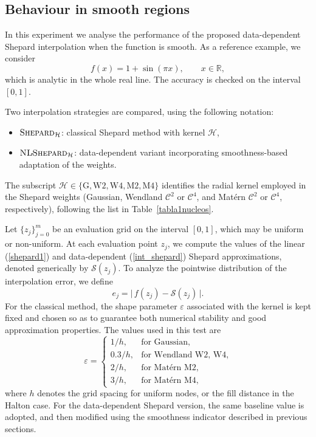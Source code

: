 \documentclass[preprint]{elsarticle}       %
\begin{document}
\subsection{Behaviour in smooth regions}

In this experiment we analyse the performance of the proposed data-dependent Shepard interpolation when the function is smooth. As a reference example, we consider
\begin{equation}\label{funcion_f}
f(x)=1+\sin(\pi x), \qquad x\in\mathbb{R},
\end{equation}
which is analytic in the whole real line. The accuracy is checked on the interval $[0,1]$.

Two interpolation strategies are compared, using the following notation:
\begin{itemize}
    \item $\textsc{Shepard}_{\mathcal H}$: classical Shepard method with kernel $\mathcal H$,
    \item $\textsc{NL\!-\!Shepard}_{\mathcal H}$: data-dependent variant incorporating smoothness-based adaptation of the weights.
\end{itemize}

The subscript $\mathcal H\in\{\text{G},\text{W2},\text{W4},\text{M2},\text{M4}\}$ identifies the radial kernel employed in the Shepard weights (Gaussian, Wendland $\mathcal{C}^2$ or $\mathcal{C}^4$, and Mat\'ern $\mathcal{C}^2$ or $\mathcal{C}^4$, respectively), following the list in Table~\ref{tabla1nucleos}.

Let \(\{z_j\}_{j=0}^{m}\) be an evaluation grid on the interval \([0,1]\), which may be uniform or non-uniform. At each evaluation point \(z_j\), we compute the values of the linear (\ref{shepard1}) and data-dependent (\ref{int_shepard}) Shepard approximations, denoted generically by \(\mathcal{S}(z_j)\). To analyze the pointwise distribution of the interpolation error, we define
\begin{equation}\label{error}
e_j = \big|\, f(z_j) - \mathcal{S}(z_j)\,\big|.
\end{equation}
For the classical method, the shape parameter $\varepsilon$ associated with the kernel is kept fixed and chosen so as to guarantee both numerical stability and good approximation properties.  
The values used in this test are
\begin{equation}\label{vareps}
\varepsilon = 
\begin{cases}
1/h, & \text{for Gaussian},\\[4pt]
0.3/h, & \text{for Wendland W2, W4},\\[4pt]
2/h, & \text{for Mat\'ern M2},\\[4pt]
3/h, & \text{for Mat\'ern M4},
\end{cases}
\end{equation}
where $h$ denotes the grid spacing for uniform nodes, or the fill distance in the Halton case.  
For the data-dependent Shepard version, the same baseline value is adopted, and then modified using the smoothness indicator described in previous sections.  
\end{document}
